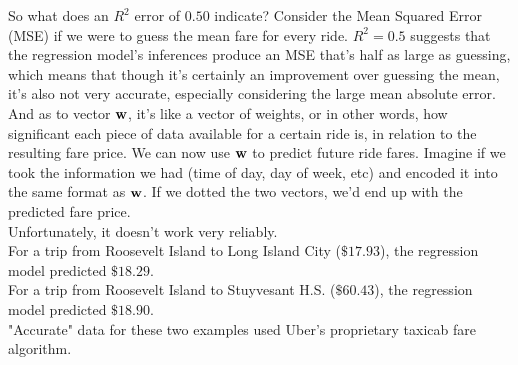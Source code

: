 \documentclass[12pt]{article}
\newcommand{\vect}[1]{\begingroup\renewcommand{\arraystretch}{0.5}\mathbf{#1}\endgroup}
\begin{document}
So what does an $R^2$ error of $0.50$ indicate? Consider the Mean Squared Error (MSE) if we were to guess the mean fare for every ride. $R^2 = 0.5$ suggests that
the regression model's inferences produce an MSE that's half as large as guessing, which means that though it's certainly an improvement over guessing the mean, 
it's also not very accurate, especially considering the large mean absolute error. \\

And as to vector $\vect{w}$, it's like a vector of weights, or in other words, how significant each piece of data available for a certain ride is, in relation to 
the resulting fare price. We can now use $\vect{w}$ to predict future ride fares. Imagine if we took the information we had (time of day, day of week, etc) and
encoded it into the same format as $\vect{w}$. If we dotted the two vectors, we'd end up with the predicted fare price. \\

Unfortunately, it doesn't work very reliably. \\

For a trip from Roosevelt Island to Long Island City ($\$17.93$), the regression model predicted $\$18.29$.\\
For a trip from Roosevelt Island to Stuyvesant H.S.  ($\$60.43$), the regression model predicted $\$18.90$. \\

"Accurate" data for these two examples used Uber's proprietary taxicab fare algorithm. 
\end{document}

